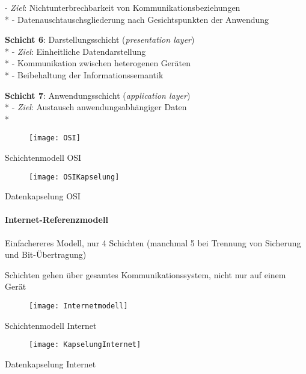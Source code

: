 \begin{items}
    - \emph{Ziel}: Nichtunterbrechbarkeit von Kommunikationsbeziehungen \\*
    - Datenauschtauschsgliederung nach Gesichtspunkten der Anwendung
  \item \textbf{Schicht 6}: Darstellungsschicht (\emph{presentation layer}) \\*
    - \emph{Ziel}: Einheitliche Datendarstellung \\*
    - Kommunikation zwischen heterogenen Geräten \\*
    - Beibehaltung der Informationssemantik
  \item \textbf{Schicht 7}: Anwendungsschicht (\emph{application layer}) \\*
    - \emph{Ziel}: Austausch anwendungsabhängiger Daten \\*
\end{items}
\begin{figure}[H]\centering\label{OSI}\texttt{[image: OSI]}\end{figure}
\begin{center}
  Schichtenmodell OSI
\end{center}
\begin{figure}[H]\centering\label{OSIKapselung}\texttt{[image: OSIKapselung]}\end{figure}
\begin{center}
  Datenkapselung OSI
\end{center}

\paragraph{Internet-Referenzmodell}
\begin{items}
  \item Einfachereres Modell, nur 4 Schichten (manchmal 5 bei Trennung von Sicherung und Bit-Übertragung)
  \item Schichten gehen über gesamtes Kommunikationssystem, nicht nur auf einem Gerät
\end{items}
\begin{figure}[H]\centering\label{Internetmodell}\texttt{[image: Internetmodell]}\end{figure}
\begin{center}
  Schichtenmodell Internet
\end{center}
\begin{figure}[H]\centering\label{KapselungInternet}\texttt{[image: KapselungInternet]}\end{figure}
\begin{center}
  Datenkapselung Internet
\end{center}

